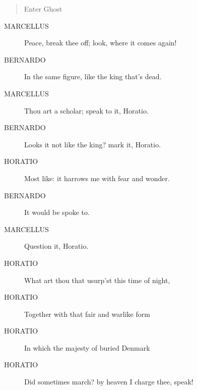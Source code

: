 \documentclass{article}
\begin{document}
\begin{quote}
Enter Ghost
\end{quote}
          
\begin{description}
            
\item[MARCELLUS] Peace, break thee off; look, where it comes again!
\end{description}
          
\begin{description}
            
\item[BERNARDO] In the same figure, like the king that's dead.
\end{description}
          
\begin{description}
            
\item[MARCELLUS] Thou art a scholar; speak to it, Horatio.
\end{description}
          
\begin{description}
            
\item[BERNARDO] Looks it not like the king?  mark it, Horatio.
\end{description}
          
\begin{description}
            
\item[HORATIO] Most like: it harrows me with fear and wonder.
\end{description}
          
\begin{description}
            
\item[BERNARDO] It would be spoke to.
\end{description}
          
\begin{description}
            
\item[MARCELLUS] Question it, Horatio.
\end{description}
          
\begin{description}
            
\item[HORATIO] What art thou that usurp'st this time of night,
\item[HORATIO] Together with that fair and warlike form
\item[HORATIO] In which the majesty of buried Denmark
\item[HORATIO] Did sometimes march? by heaven I charge thee, speak!
\end{description}
          
\end{document}
